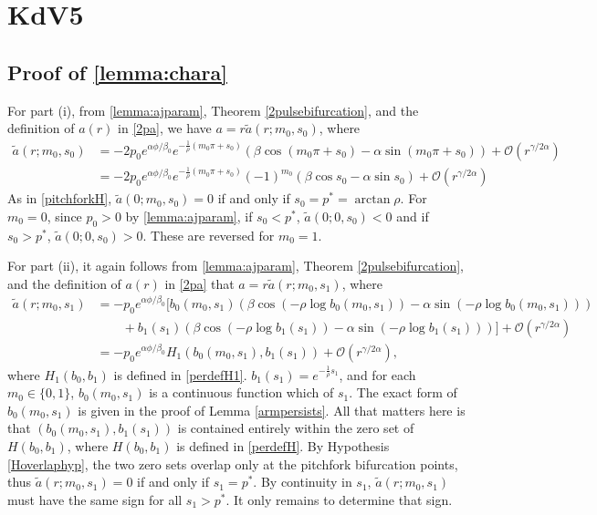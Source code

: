\documentclass[thesis.tex]{subfiles}
\begin{document}
\iffulldocument\else
	\chapter{KdV5}
\fi

\section{Proof of \cref{lemma:chara}}

For part (i), from \cref{lemma:ajparam}, Theorem \cref{2pulsebifurcation}, and the definition of $a(r)$ in \cref{2pa}, we have $a = r \tilde{a}(r; m_0, s_0)$, where
\begin{align*}
\tilde{a}(r; m_0, s_0) &= -2 p_0 e^{\alpha \phi/\beta_0} e^{-\frac{1}{\rho}(m_0 \pi + s_0)} \left( \beta \cos\left(m_0 \pi + s_0 \right) - \alpha \sin \left(m_0 \pi + s_0 \right) \right) + \mathcal{O}(r^{\gamma/2\alpha}) \\
&= -2 p_0 e^{\alpha \phi/\beta_0} e^{-\frac{1}{\rho}(m_0 \pi + s_0)} (-1)^{m_0} \left( \beta \cos s_0 - \alpha \sin s_0 \right) + \mathcal{O}(r^{\gamma/2\alpha})
\end{align*}
As in \cref{pitchforkH}, $\tilde{a}(0; m_0, s_0) = 0$ if and only if $s_0 = p^* = \arctan \rho$. For $m_0 = 0$, since $p_0 > 0$ by \cref{lemma:ajparam}, if $s_0 < p^*$, $\tilde{a}(0; 0, s_0) < 0$ and if $s_0 > p^*$, $\tilde{a}(0; 0, s_0) > 0$. These are reversed for $m_0 = 1$.

For part (ii), it again follows from \cref{lemma:ajparam}, Theorem \cref{2pulsebifurcation}, and the definition of $a(r)$ in \cref{2pa} that $a = r \tilde{a}(r; m_0, s_1)$, where
\begin{align*}
\tilde{a}(r; m_0, s_1) &= -p_0 e^{\alpha \phi/\beta_0} \Big[ b_0(m_0, s_1) \left( \beta \cos\left(-\rho \log b_0(m_0, s_1) \right) - \alpha \sin \left(-\rho \log b_0(m_0, s_1) \right) \right) \\
&\qquad+ b_1(s_1) \left( \beta \cos\left(-\rho \log b_1(s_1) \right) - \alpha \sin \left(-\rho \log b_1(s_1) \right) \right) \Big]  + \mathcal{O}(r^{\gamma/2\alpha}) \\
&= -p_0 e^{\alpha \phi/\beta_0} H_1( b_0(m_0, s_1), b_1(s_1) ) + \mathcal{O}(r^{\gamma/2\alpha}),
\end{align*}
where $H_1(b_0, b_1)$ is defined in \cref{perdefH1}.
$b_1(s_1) = e^{-\frac{1}{\rho}s_1}$, and for each $m_0 \in \{ 0, 1 \}$, $b_0(m_0, s_1)$ is a continuous function which of $s_1$. The exact form of $b_0(m_0, s_1)$ is given in the proof of Lemma \ref{armpersists}. All that matters here is that $(b_0(m_0, s_1), b_1(s_1))$ is contained entirely within the zero set of $H(b_0, b_1)$, where $H(b_0, b_1)$ is defined in \cref{perdefH}. By Hypothesis \ref{Hoverlaphyp}, the two zero sets overlap only at the pitchfork bifurcation points, thus $\tilde{a}(r; m_0, s_1) = 0$ if and only if $s_1 = p^*$. By continuity in $s_1$, $\tilde{a}(r; m_0, s_1)$ must have the same sign for all $s_1 > p^*$. It only remains to determine that sign.
\end{document}
